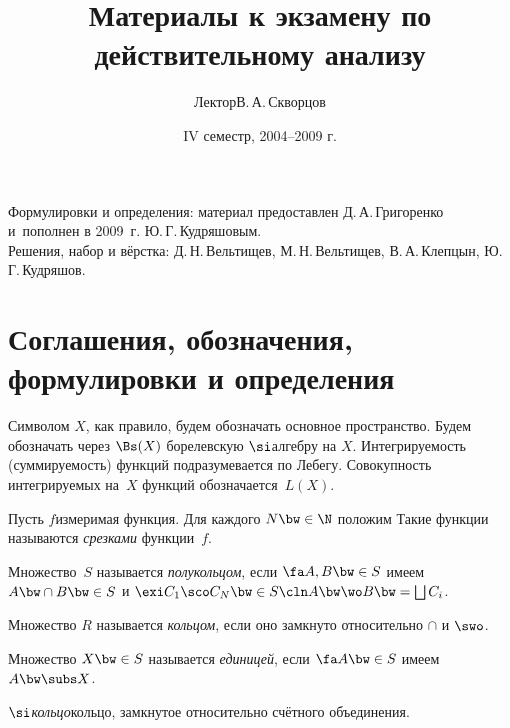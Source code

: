\documentclass[a4paper,draft]{article}
\title{Материалы к экзамену по действительному анализу}
\author{Лектор\т В.\,А.\,Скворцов}
\date{IV семестр, 2004--2009 г.}
\begin{document}
\maketitle
\begin{center}
  {\footnotesize
  Формулировки и определения: материал предоставлен Д.\,А.\,Григоренко
  и~пополнен в 2009~г. Ю.\,Г.\,Кудряшовым.\\
  Решения, набор и вёрстка: Д.\,Н.\,Вельтищев, М.\,Н.\,Вельтищев,
  В.\,А.\,Клепцын, Ю.\,Г.\,Кудряшов.\par}
\end{center}

\section{Соглашения, обозначения, формулировки и определения}

Символом $X$, как правило, будем обозначать основное пространство.
Будем обозначать через $\Bs(X)$ борелевскую $\si$\д алгебру на $X$.
Интегрируемость (суммируемость) функций подразумевается по Лебегу.
Совокупность интегрируемых на~$X$ функций обозначается~$L(X)$.

\begin{df}
  Пусть $f$\т измеримая функция. Для каждого $N \bw\in \N$ положим
  Такие функции называются \emph{срезками} функции~$f$.
\end{df}

\begin{df}
  Множество~$S$ называется \emph{полукольцом}, если $\fa A,B\bw\in S$ имеем $A\bw\cap B \bw\in S$ и
  $\exi C_1\sco C_N \bw\in S\cln A \bw\wo B \bw= \bigsqcup C_i$.
\end{df}

\begin{df}
  Множество $R$ называется \emph{кольцом}, если оно замкнуто относительно $\cap$ и $\swo$.
\end{df}

\begin{df}
  Множество $X \bw\in S$ называется \emph{единицей}, если $\fa A \bw\in S$ имеем $A \bw\subs X$.
\end{df}

\begin{df}
  \emph{$\si$\д кольцо}\т кольцо, замкнутое относительно счётного объединения.
\end{df}
\end{document}

